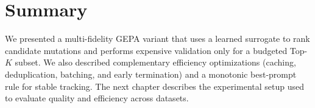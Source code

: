 \section{Summary}
We presented a multi-fidelity GEPA variant that uses a learned surrogate to rank candidate mutations and performs expensive validation only for a budgeted Top-$K$ subset. We also described complementary efficiency optimizations (caching, deduplication, batching, and early termination) and a monotonic best-prompt rule for stable tracking. The next chapter describes the experimental setup used to evaluate quality and efficiency across datasets.